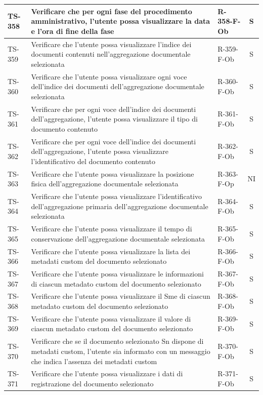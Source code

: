 \documentclass[a4paper,12pt]{article}
\begin{document}
\begin{longtable}{|p{1.5cm}|p{8.3cm}|p{2.4cm}|c|}
\hline
TS-358 & Verificare che per ogni fase del procedimento amministrativo, l'utente possa visualizzare la data e l'ora di fine della fase & R-358-F-Ob & S \\
\hline
TS-359 & Verificare che l'utente possa visualizzare l'indice dei documenti contenuti nell'aggregazione documentale selezionata & R-359-F-Ob & S \\
\hline
TS-360 & Verificare che l'utente possa visualizzare ogni voce dell'indice dei documenti dell'aggregazione documentale selezionata & R-360-F-Ob & S \\
\hline
TS-361 & Verificare che per ogni voce dell'indice dei documenti dell'aggregazione, l'utente possa visualizzare il tipo di documento contenuto & R-361-F-Ob & S \\
\hline
TS-362 & Verificare che per ogni voce dell'indice dei documenti dell'aggregazione, l'utente possa visualizzare l'identificativo del documento contenuto & R-362-F-Ob & S \\
\hline
TS-363 & Verificare che l'utente possa visualizzare la posizione fisica dell'aggregazione documentale selezionata & R-363-F-Op & NI \\
\hline
TS-364 & Verificare che l'utente possa visualizzare l'identificativo dell'aggregazione primaria dell'aggregazione documentale selezionata & R-364-F-Ob & S \\
\hline
TS-365 & Verificare che l'utente possa visualizzare il tempo di conservazione dell'aggregazione documentale selezionata & R-365-F-Ob & S \\
\hline
TS-366 & Verificare che l'utente possa visualizzare la lista dei metadati custom del documento selezionato & R-366-F-Ob & S \\
\hline
TS-367 & Verificare che l'utente possa visualizzare le informazioni di ciascun metadato custom del documento selezionato & R-367-F-Ob & S \\
\hline
TS-368 & Verificare che l'utente possa visualizzare il Sme di ciascun metadato custom del documento selezionato & R-368-F-Ob & S \\
\hline
TS-369 & Verificare che l'utente possa visualizzare il valore di ciascun metadato custom del documento selezionato & R-369-F-Ob & S \\
\hline
TS-370 & Verificare che se il documento selezionato Sn dispone di metadati custom, l'utente sia informato con un messaggio che indica l'assenza dei metadati custom & R-370-F-Ob & S \\
\hline
TS-371 & Verificare che l'utente possa visualizzare i dati di registrazione del documento selezionato & R-371-F-Ob & S \\

\end{longtable}
\end{document}
